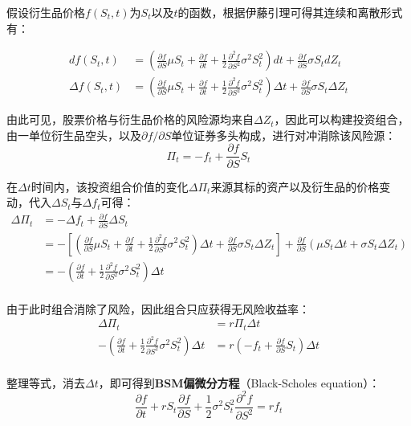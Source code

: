 \documentclass[11pt]{article}
\begin{document}
假设衍生品价格$f(S_t, t)$为$S_t$以及$t$的函数，根据伊藤引理可得其连续和离散形式有：

\begin{align*}
    df(S_t,t) & = \left(\frac{\partial f}{\partial S} \mu S_t  + \frac{\partial f}{\partial t} + \frac{1}{2}\frac{\partial^2 f}{\partial S^2} \sigma^2 S_t^2 \right)dt + \frac{\partial f}{\partial S} \sigma S_t dZ_t \\
    \Delta f(S_t,t) & = \left(\frac{\partial f}{\partial S} \mu S_t  + \frac{\partial f}{\partial t} + \frac{1}{2}\frac{\partial^2 f}{\partial S^2} \sigma^2 S_t^2 \right) \Delta t + \frac{\partial f}{\partial S} \sigma S_t \Delta Z_t
\end{align*}

由此可见，股票价格与衍生品价格的风险源均来自$\Delta Z_t$，因此可以构建投资组合，由一单位衍生品空头，以及$\partial f/\partial S$单位证券多头构成，进行对冲消除该风险源：
\begin{equation*}
    \Pi_t = -f_t + \frac{\partial f}{\partial S} S_t
\end{equation*}

在$\Delta t$时间内，该投资组合价值的变化$\Delta \Pi_t$来源其标的资产以及衍生品的价格变动，代入$\Delta S_t$与$\Delta f_t$可得：
\begin{align*}
    \Delta \Pi_t & = -\Delta f_t + \frac{\partial f}{\partial S} \Delta S_t \\
    & = -\left[ \left(\frac{\partial f}{\partial S} \mu S_t  + \frac{\partial f}{\partial t} + \frac{1}{2}\frac{\partial^2 f}{\partial S^2} \sigma^2 S_t^2 \right) \Delta t + \frac{\partial f}{\partial S} \sigma S_t \Delta Z_t \right] + \frac{\partial f}{\partial S} \left( \mu S_t \Delta t + \sigma S_t \Delta Z_t \right) \\
    & = -\left( \frac{\partial f}{\partial t} + \frac{1}{2}\frac{\partial^2 f}{\partial S^2} \sigma^2 S_t^2 \right) \Delta t \\
\end{align*}

由于此时组合消除了风险，因此组合只应获得无风险收益率：
\begin{align*}
    \Delta \Pi_t & = r \Pi_t \Delta t \\
    -\left( \frac{\partial f}{\partial t} + \frac{1}{2}\frac{\partial^2 f}{\partial S^2} \sigma^2 S_t^2 \right) \Delta t & =  r \left( -f_t + \frac{\partial f}{\partial S} S_t \right) \Delta t \\
\end{align*}

整理等式，消去$\Delta t$，即可得到\textbf{BSM偏微分方程}（Black-Scholes equation）：
\begin{equation*}
    \frac{\partial f}{\partial t} + r S_t \frac{\partial f}{\partial S} + \frac{1}{2} \sigma^2 S_t^2 \frac{\partial^2 f}{\partial S^2} = r f_t
\end{equation*}
\end{document}
